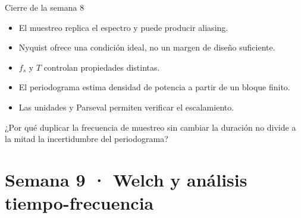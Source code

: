 \documentclass[
  ignorenonframetext,
  aspectratio=169,
  spanish,
]{beamer}
\providecommand{\tightlist}{%
  \setlength{\itemsep}{0pt}\setlength{\parskip}{0pt}}
\begin{document}
\begin{frame}{Cierre de la semana 8}
  \protect{}\label{cierre-de-la-semana-8}
  \begin{itemize}
    \tightlist
    \item
          El muestreo replica el espectro y puede producir aliasing.
    \item
          Nyquist ofrece una condición ideal, no un margen de diseño suficiente.
    \item
          \(f_s\) y \(T\) controlan propiedades distintas.
    \item
          El periodograma estima densidad de potencia a partir de un bloque
          finito.
    \item
          Las unidades y Parseval permiten verificar el escalamiento.
  \end{itemize}

  \begin{tcolorbox}[enhanced jigsaw, arc=.35mm, bottomrule=.15mm, bottomtitle=1mm, breakable, colback=white, colbacktitle=quarto-callout-note-color!10!white, colframe=quarto-callout-note-color-frame, coltitle=black, left=2mm, leftrule=.75mm, opacityback=0, opacitybacktitle=0.6, rightrule=.15mm, title=\textcolor{quarto-callout-note-color}{\faInfo}\hspace{0.5em}{Pregunta de salida}, titlerule=0mm, toprule=.15mm, toptitle=1mm]

    ¿Por qué duplicar la frecuencia de muestreo sin cambiar la duración no
    divide a la mitad la incertidumbre del periodograma?

  \end{tcolorbox}
\end{frame}

\section{Semana 9 · Welch y análisis
  tiempo-frecuencia}\label{semana-9-welch-y-anuxe1lisis-tiempo-frecuencia}
\end{document}
